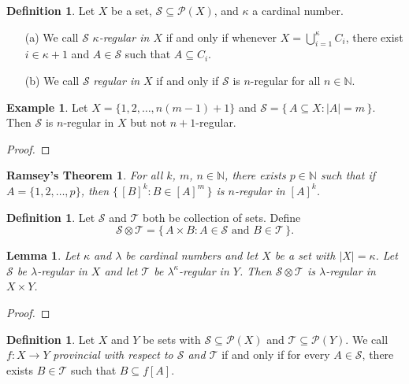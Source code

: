 \documentclass[12pt]{article}
\theoremstyle{plain}
\newtheorem*{ramsey}{Ramsey's Theorem}
\newtheorem{lem}[thm]{Lemma}
\theoremstyle{definition}
\newtheorem{defn}[thm]{Definition}
\newtheorem{example}[thm]{Example}
\newcommand{\bbN}{\mathbb{N}}
\newcommand{\calP}{\mathcal{P}}
\newcommand{\calS}{\mathcal{S}}
\newcommand{\calT}{\mathcal{T}}
\begin{document}
\begin{defn}
  Let $X$ be a set, $\calS \subseteq \calP(X)$, and $\kappa$ a
  cardinal number.
  \begin{itemize}
    \item[(a)] We call $\calS$ \textsl{\mbox{$\kappa$-regular} in $X$}
      if and only if whenever $X = \bigcup_{i=1}^\kappa C_i$, there
      exist $i \in \kappa+1$ and $A \in \calS$ such that $A \subseteq
      C_i$.

    \item[(b)] We call $\calS$ \textsl{regular in $X$} if and only if
      $\calS$ is \mbox{$n$-regular} for all $n \in \bbN$.
  \end{itemize}
\end{defn}

\begin{example}
  Let $X = \{1, 2, \ldots, n(m-1) + 1\}$ and $\calS = \{\, A \subseteq
  X : |A| = m \,\}$.
  Then $\calS$ is \mbox{$n$-regular} in $X$ but not
  \mbox{$n+1$-regular}.
\end{example}
\begin{proof}
  
\end{proof}

\begin{ramsey}
  For all $k$, $m$, $n \in \bbN$, there exists $p \in \bbN$ such that
  if $A = \{1, 2, \ldots, p\}$, then $\bigl\{\, [B]^k : B \in [A]^m
  \,\bigr\}$ is \mbox{$n$-regular} in $[A]^k$.
\end{ramsey}

\begin{defn}
  Let $\calS$ and $\calT$ both be collection of sets.
  Define
  \[
    \calS \otimes \calT = \{\, A \times B : \mbox{$A \in \calS$ and
      $B \in \calT$} \,\}.
  \]
\end{defn}

\begin{lem}
  Let $\kappa$ and $\lambda$ be cardinal numbers and let $X$ be a set
  with $|X| = \kappa$. 
  Let $\calS$ be \mbox{$\lambda$-regular} in $X$ and let $\calT$ be
  \mbox{$\lambda^\kappa$-regular} in $Y$.
  Then $\calS \otimes \calT$ is \mbox{$\lambda$-regular} in $X \times
  Y$.
\end{lem}
\begin{proof}
  
\end{proof}

\begin{defn}
  Let $X$ and $Y$ be sets with $\calS \subseteq \calP(X)$ and $\calT
  \subseteq \calP(Y)$.
  We call $f \colon X \to Y$ \textsl{provincial with respect to
    $\calS$ and $\calT$} if and only if for every $A \in \calS$, there
  exists $B \in \calT$ such that $B \subseteq f[A]$.
\end{defn}
\end{document}

